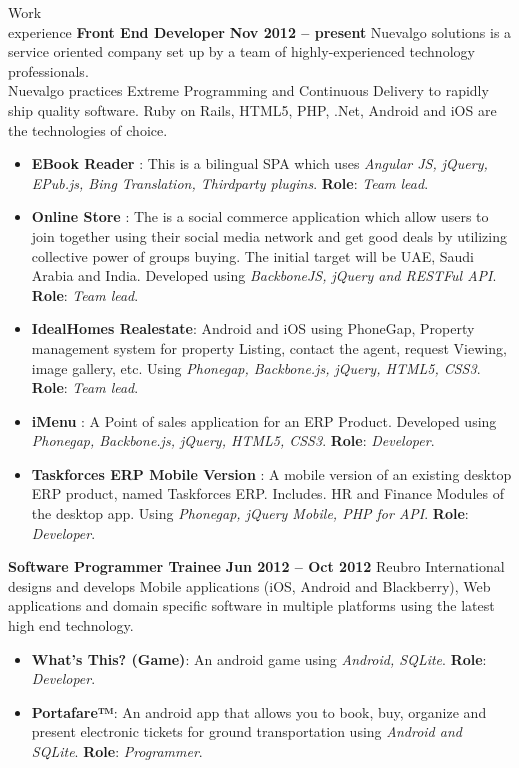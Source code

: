 \documentclass{resume}
\begin{document}
\begin{category}{Work \\experience}
  \citemnobullet \textbf{Front End Developer} \hfill \textbf{Nov 2012 -- present}
  \citemnobullet Nuevalgo solutions is a service oriented company set up by a team of highly-experienced technology professionals. \\Nuevalgo practices Extreme Programming and Continuous
  Delivery to rapidly ship quality software. Ruby on Rails, HTML5, PHP, .Net, Android and iOS are the technologies of choice.
  \begin{itemize}
  \item \textbf{EBook Reader} : This is a bilingual SPA which uses {\em Angular JS, jQuery, EPub.js, Bing Translation, Thirdparty plugins}. \textbf{Role}: {\em Team lead}. 
  \item \textbf{Online Store} : The is a social commerce application which allow users to join together using their social media network and get good deals by utilizing collective power of groups buying. The initial target will be UAE, Saudi Arabia and India. Developed using {\em BackboneJS, jQuery and RESTFul API}. \textbf{Role}: {\em Team lead}.
  \item \textbf{IdealHomes Realestate}: Android and iOS using PhoneGap, Property management system for property Listing, contact the agent, request Viewing, image gallery, etc. Using {\em Phonegap, Backbone.js, jQuery, HTML5, CSS3}. \textbf{Role}: {\em Team lead}.
  \item \textbf{iMenu} : A Point of sales application for an ERP Product. Developed using {\em Phonegap, Backbone.js, jQuery, HTML5, CSS3}. \textbf{Role}: {\em Developer}.
  \item \textbf{Taskforces ERP Mobile Version} : A mobile version of an existing desktop ERP product, named Taskforces ERP. Includes. HR and Finance Modules of the desktop app. Using{\em
      Phonegap, jQuery Mobile, PHP for API}. \textbf{Role}: {\em Developer}. 
  \end{itemize}
  \citemnobullet \textbf{Software Programmer Trainee} \hfill \textbf{Jun 2012 -- Oct 2012}
  \citemnobullet Reubro International designs and develops Mobile applications (iOS, Android and Blackberry), Web applications and domain specific software in multiple platforms using the latest high end technology.
  \begin{itemize} 
  \item \textbf{What’s This? (Game)}: An android game using {\em Android, SQLite}. \textbf{Role}: {\em Developer}.
  \item \textbf{Portafare™}:  An android app that allows you to book, buy, organize and present electronic tickets for ground transportation using {\em Android and SQLite}. \textbf{Role}: {\em Programmer}.
  \end{itemize}
\end{category}
\end{document}
